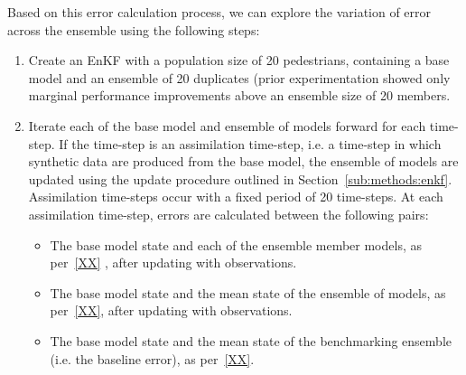 \documentclass{article}
\begin{document}
Based on this error calculation process, we can explore the variation of error across the ensemble using the following steps:
\begin{enumerate}
	\item Create an EnKF with a population size of 20 pedestrians, containing a base model and an ensemble of 20 duplicates (prior experimentation showed only marginal performance improvements above an ensemble size of 20 members. %
	\item Iterate each of the base model and ensemble of models forward for each time-step. If the time-step is an assimilation time-step, i.e. a time-step in which synthetic data are produced from the base model, the ensemble of models are updated using the update procedure outlined in
	Section~\ref{sub:methods:enkf}. Assimilation time-steps occur with a fixed period of 20 time-steps. %
	At each assimilation time-step, errors are calculated between the following pairs:
	\begin{itemize}
		\item The base model state and each of the ensemble member models, as per~\eqref{XX} , after updating with observations.
		\item The base model state and the mean state of the ensemble of
		models, as per~\eqref{XX}, after updating with observations.
		\item The base model state and the mean state of the benchmarking ensemble (i.e. the baseline error), as per~\eqref{XX}.
	\end{itemize}
\end{enumerate}


\end{document}
